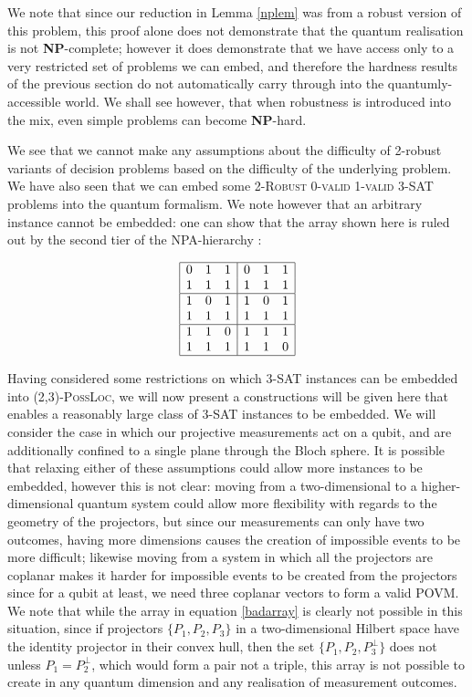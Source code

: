 \documentclass[reprint]{revtex4-1}
\theoremstyle{definition}
\begin{document}
We note that since our reduction in Lemma \ref{nplem} was from a robust version of this problem, this proof alone does not demonstrate that the quantum realisation is not \textbf{NP}-complete; however it does demonstrate that we have access only to a very restricted set of problems we can embed, and therefore the hardness results of the previous section do not automatically carry through into the quantumly-accessible world. We shall see however, that when robustness is introduced into the mix, even simple problems can become \textbf{NP}-hard.


We see that we cannot make any assumptions about the difficulty of 2-robust variants of decision problems based on the difficulty of the underlying problem. We have also seen that we can embed some \textsc{2-Robust 0-valid 1-valid 3-SAT} problems into the quantum formalism. We note however that an arbitrary instance cannot be embedded: one can show that the array shown here is ruled out by the second tier of the NPA-hierarchy \cite{Nava2008}:

\begin{equation*} \label{badarray}
\begin{array}{  | c c  c| c c c|}
\hline
 0 & 1 & 1 & 0 & 1 & 1 \\
 1 & 1& 1& 1 & 1& 1 \\ \hline
 1 &0 & 1 & 1 &0 & 1 \\
 1 & 1& 1 & 1 & 1& 1  \\ \hline
 1 & 1 & 0&  1 & 1 & 1\\
 1 & 1& 1 &1 & 1 & 0 \\ \hline
 \end{array}
 \end{equation*}
 
Having considered some restrictions on which \textsc{3-SAT} instances can be embedded into \textsc{(2,3)-PossLoc}, we will now present a constructions will be given here that enables a reasonably large class of \textsc{3-SAT} instances to be embedded. We will consider the case in which our projective measurements act on a qubit, and are additionally confined to a single plane through the Bloch sphere. It is possible that relaxing either of these assumptions could allow more instances to be embedded, however this is not clear: moving from a two-dimensional to a higher-dimensional quantum system could allow more flexibility with regards to the geometry of the projectors, but since our measurements can only have two outcomes, having more dimensions causes the creation of impossible events to be more difficult; likewise moving from a system in which all the projectors are coplanar makes it harder for impossible events to be created from the projectors since for a qubit at least, we need three coplanar vectors to form a valid POVM. We note that while the array in equation \ref{badarray} is clearly not possible in this situation, since if projectors $\{P_1,P_2,P_3\}$ in a two-dimensional Hilbert space have the identity projector in their convex hull, then the set $\{P_1,P_2, P_3^\perp\}$ does not unless $P_1=P_2^\perp$, which would form a pair not a triple, this array is not possible to create in any quantum dimension and any realisation of measurement outcomes.
\end{document}
